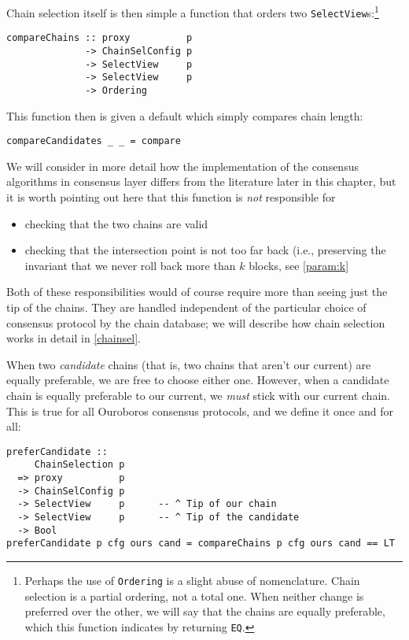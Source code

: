 Chain selection itself is then simple a function that orders two
\lstinline!SelectView!s:\footnote{Perhaps the use of \lstinline!Ordering!
is a slight abuse of nomenclature. Chain selection is a partial ordering,
not a total one. When neither change is preferred over the other, we will
say that the chains are equally preferable, which this function indicates
by returning \lstinline!EQ!.}

\begin{lstlisting}
compareChains :: proxy          p
              -> ChainSelConfig p
              -> SelectView     p
              -> SelectView     p
              -> Ordering
\end{lstlisting}

This function then is given a default which simply compares chain length:

\begin{lstlisting}
compareCandidates _ _ = compare
\end{lstlisting}

We will consider in more detail how the implementation of the consensus
algorithms in consensus layer differs from the literature later in this chapter,
but it is worth pointing out here that this function is \emph{not} responsible
for

\begin{itemize}
\item checking that the two chains are valid
\item checking that the intersection point is not too far back (i.e.,
preserving the invariant that we never roll back more than $k$ blocks,
see \cref{param:k}
\end{itemize}

Both of these responsibilities would of course require more than seeing just
the tip of the chains. They are handled independent of the particular choice of
consensus protocol by the chain database; we will describe how chain selection
works in detail in \cref{chainsel}.

When two \emph{candidate} chains (that is, two chains that aren't our current)
are equally preferable, we are free to choose either one. However, when a
candidate chain is equally preferable to our current, we \emph{must} stick
with our current chain. This is true for all Ouroboros consensus protocols,
and we define it once and for all:

\begin{lstlisting}
preferCandidate ::
     ChainSelection p
  => proxy          p
  -> ChainSelConfig p
  -> SelectView     p      -- ^ Tip of our chain
  -> SelectView     p      -- ^ Tip of the candidate
  -> Bool
preferCandidate p cfg ours cand = compareChains p cfg ours cand == LT
\end{lstlisting}

